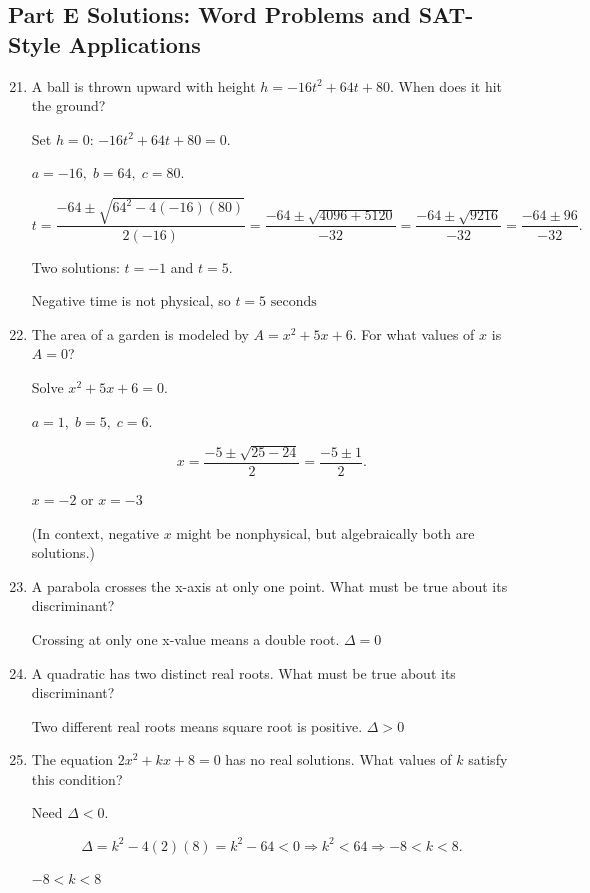 \documentclass[14pt]{extarticle}
\begin{document}
\subsection*{Part E Solutions: Word Problems and SAT-Style Applications}
\begin{enumerate}
  \setcounter{enumi}{20}
  \item A ball is thrown upward with height \(h = -16t^2 + 64t + 80.\) When does it hit the ground?

  Set \(h = 0\):  
  \(-16t^2 + 64t + 80 = 0.\)

  \(a = -16,\; b = 64,\; c = 80.\)

  \[
  t = \frac{-64 \pm \sqrt{64^2 - 4(-16)(80)}}{2(-16)}
  = \frac{-64 \pm \sqrt{4096 + 5120}}{-32}
  = \frac{-64 \pm \sqrt{9216}}{-32}
  = \frac{-64 \pm 96}{-32}.
  \]

  Two solutions: \(t = -1\) and \(t = 5.\)

  Negative time is not physical, so \(\boxed{t = 5 \text{ seconds}}\)

  \item The area of a garden is modeled by \(A = x^2 + 5x + 6.\) For what values of \(x\) is \(A = 0\)?

  Solve \(x^2 + 5x + 6 = 0.\)

  \(a = 1,\; b = 5,\; c = 6.\)

  \[
  x = \frac{-5 \pm \sqrt{25 - 24}}{2}
  = \frac{-5 \pm 1}{2}.
  \]

  \(\boxed{x = -2 \text{ or } x = -3}\)

  (In context, negative \(x\) might be nonphysical, but algebraically both are solutions.)

  \item A parabola crosses the x-axis at only one point. What must be true about its discriminant?

  Crossing at only one x-value means a double root.  
  \(\boxed{\Delta = 0}\)

  \item A quadratic has two distinct real roots. What must be true about its discriminant?

  Two different real roots means square root is positive.  
  \(\boxed{\Delta > 0}\)

  \item The equation \(2x^2 + kx + 8 = 0\) has no real solutions. What values of \(k\) satisfy this condition?

  Need \(\Delta < 0.\)

  \[
  \Delta = k^2 - 4(2)(8) = k^2 - 64 < 0
  \Rightarrow k^2 < 64
  \Rightarrow -8 < k < 8.
  \]

  \(\boxed{-8 < k < 8}\)
\end{enumerate}





\end{document}

